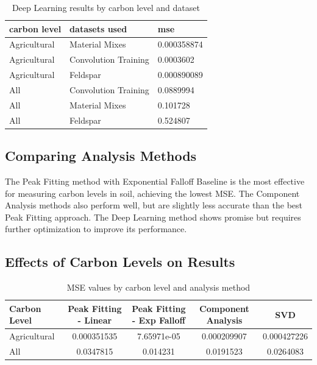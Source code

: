 \documentclass[review]{elsarticle}
\begin{document}
\begin{table}[H]
\centering
\caption{Deep Learning results by carbon level and dataset}
\label{tab:deep_learning_results}
\begin{tabular}{@{}lll@{}}
\toprule
carbon level & datasets used & mse \\
\midrule
Agricultural & Material Mixes & 0.000358874 \\
Agricultural & Convolution Training & 0.0003602 \\
Agricultural & Feldspar & 0.000890089 \\
All & Convolution Training & 0.0889994 \\
All & Material Mixes & 0.101728 \\
All & Feldspar & 0.524807 \\
\bottomrule
\end{tabular}
\end{table}

\subsection{Comparing Analysis Methods}

The Peak Fitting method with Exponential Falloff Baseline is the most effective for measuring carbon levels in soil, achieving the lowest MSE. The Component Analysis methods also perform well, but are slightly less accurate than the best Peak Fitting approach. The Deep Learning method shows promise but requires further optimization to improve its performance.

\subsection{Effects of Carbon Levels on Results}

\begin{table}[H]
\centering
\caption{MSE values by carbon level and analysis method}
\label{tab:carbon_level_results}
\begin{tabular}{@{}lcccc@{}}
\toprule
Carbon Level & Peak Fitting - Linear & Peak Fitting - Exp Falloff & Component Analysis & SVD \\
\midrule
Agricultural & 0.000351535 & 7.65971e-05 & 0.000209907 & 0.000427226 \\
All & 0.0347815 & 0.014231 & 0.0191523 & 0.0264083 \\
\bottomrule
\end{tabular}
\end{table}
\end{document}
